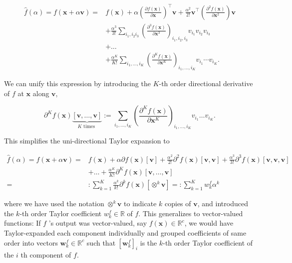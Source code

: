 \documentclass[10pt]{article}
\begin{document}
$$
\begin{aligned}
\hat{f}(\alpha)=f(\boldsymbol{x}+\alpha \boldsymbol{v})= & f(\boldsymbol{x})+\alpha\left(\frac{\partial f(\boldsymbol{x})}{\partial \boldsymbol{x}}\right)^{\top} \boldsymbol{v}+\frac{\alpha^{2}}{2!} \boldsymbol{v}^{\top}\left(\frac{\partial^{2} f(\boldsymbol{x})}{\partial \boldsymbol{x}^{2}}\right) \boldsymbol{v} \\
& +\frac{\alpha^{3}}{3!} \sum_{i_{1}, i_{2} i_{3}}\left(\frac{\partial^{3} f(\boldsymbol{x})}{\partial \boldsymbol{x}^{3}}\right)_{i_{1}, i_{2}, i_{3}} v_{i_{1}} v_{i_{2}} v_{i_{3}} \\
& +\ldots \\
& +\frac{\alpha^{K}}{K!} \sum_{i_{1}, \ldots, i_{K}}\left(\frac{\partial^{K} f(\boldsymbol{x})}{\partial \boldsymbol{x}^{K}}\right)_{i_{1}, \ldots, i_{K}} v_{i_{1}} \cdots v_{i_{K}} .
\end{aligned}
$$

We can unify this expression by introducing the $K$-th order directional derivative of $f$ at $\boldsymbol{x}$ along $\boldsymbol{v}$,

$$
\partial^{K} f(\boldsymbol{x}) \underbrace{[\boldsymbol{v}, \ldots, \boldsymbol{v}]}_{K \text { times }}:=\sum_{i_{1}, \ldots, i_{K}}\left(\frac{\partial^{K} f(\boldsymbol{x})}{\partial \boldsymbol{x}^{K}}\right)_{i_{1}, \ldots, i_{K}} v_{i_{1}} \ldots v_{i_{K}} .
$$

This simplifies the uni-directional Taylor expansion to

$$
\begin{aligned}
\hat{f}(\alpha)=f(\boldsymbol{x}+\alpha \boldsymbol{v})= & f(\boldsymbol{x})+\alpha \partial f(\boldsymbol{x})[\boldsymbol{v}]+\frac{\alpha^{2}}{2!} \partial^{2} f(\boldsymbol{x})[\boldsymbol{v}, \boldsymbol{v}]+\frac{\alpha^{3}}{3!} \partial^{3} f(\boldsymbol{x})[\boldsymbol{v}, \boldsymbol{v}, \boldsymbol{v}] \\
& +\ldots+\frac{\alpha^{K}}{K!} \partial^{K} f(\boldsymbol{x})[\boldsymbol{v}, \ldots, \boldsymbol{v}] \\
= & : \sum_{k=1}^{K} \frac{\alpha^{k}}{k!} \partial^{k} f(\boldsymbol{x})\left[\otimes^{k} \boldsymbol{v}\right]=: \sum_{k=1}^{K} w_{k}^{f} \alpha^{k}
\end{aligned}
$$

where we have used the notation $\otimes^{k} \boldsymbol{v}$ to indicate $k$ copies of $\boldsymbol{v}$, and introduced the $k$-th order Taylor coefficient $w_{k}^{f} \in \mathbb{R}$ of $f$. This generalizes to vector-valued functions: If $f$ 's output was vector-valued, say $f(\boldsymbol{x}) \in \mathbb{R}^{c}$, we would have Taylor-expanded each component individually and grouped coefficients of same order into vectors $\boldsymbol{w}_{k}^{f} \in \mathbb{R}^{c}$ such that $\left[\boldsymbol{w}_{k}^{f}\right]_{i}$ is the $k$-th order Taylor coefficient of the $i$ th component of $f$.
\end{document}
